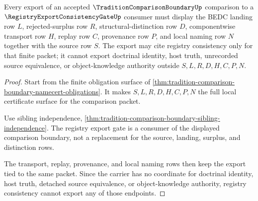 \begin{theorem}
\label{thm:tradition-comparison-boundary-export-consistency-obligation}
Every export of an accepted $\TraditionComparisonBoundaryUp$ comparison to a $\RegistryExportConsistencyGateUp$ consumer must display the BEDC landing row $L$, rejected-surplus row $R$, structural-distinction row $D$, componentwise transport row $H$, replay row $C$, provenance row $P$, and local naming row $N$ together with the source row $S$. The export may cite registry consistency only for that finite packet; it cannot export doctrinal identity, host truth, unrecorded source equivalence, or object-knowledge authority outside $S,L,R,D,H,C,P,N$.
\end{theorem}
\begin{proof}
Start from the finite obligation surface of \autoref{thm:tradition-comparison-boundary-namecert-obligations}. It makes $S,L,R,D,H,C,P,N$ the full local certificate surface for the comparison packet.

Use sibling independence, \autoref{thm:tradition-comparison-boundary-sibling-independence}. The registry export gate is a consumer of the displayed comparison boundary, not a replacement for the source, landing, surplus, and distinction rows.

The transport, replay, provenance, and local naming rows then keep the export tied to the same packet. Since the carrier has no coordinate for doctrinal identity, host truth, detached source equivalence, or object-knowledge authority, registry consistency cannot export any of those endpoints.
\end{proof}

